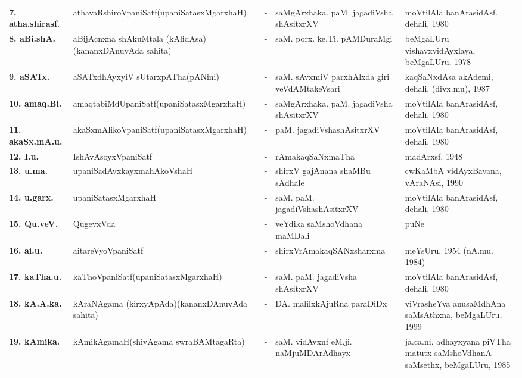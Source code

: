 {\begin{longtable}{@{}lp{5cm}cp{5cm}<{\raggedright}p{3cm}<{\raggedright}@{}}
{\bf 7. atha.shirasf.} & athavaRshiroVpaniSatf\newline (upaniSatasxMgarxhaH) &-& saMgArxhaka. paM. jagadiVsha shAsitxrXV & moVtilAla banArasidAsf. dehali, 1980\\
{\bf 8. aBi.shA.} & aBijAcnxna shAkuMtala (kAlidAsa)\newline (kananxDAnuvAda sahita) &-& saM. porx. ke.Ti. pAMDuraMgi &  beMgaLUru vishavxvidAyxlaya, beMgaLUru, 1978\\
{\bf 9. aSATx.} & aSATxdhAyxyiV sUtarxpATha\newline (pANini) &-& saM. sAvxmiV parxhAlxda giri veVdAMtakeVsari & kaqSaNxdAsa akAdemi, dehali, (divx.mu), 1987\\
{\bf 10. amaq.Bi.} & amaqtabiMdUpaniSatf\newline (upaniSatasxMgarxhaH) &-& saMgArxhaka. paM. jagadiVsha shAsitxrXV & moVtilAla banArasidAsf,  dehali, 1980\\
{\bf 11. akaSx.mA.u.} & akaSxmAlikoVpaniSatf\newline (upaniSatasxMgarxhaH) &-& paM. jagadiVshashAsitxrXV & moVtilAla banArasidAsf, dehali, 1980\\
{\bf 12. I.u.} & IshAvAsoyxVpaniSatf &-& rAmakaqSaNxmaTha & madArxsf, 1948\\
{\bf 13. u.ma.} & upaniSadAvxkayxmahAkoVshaH &-& shirxV gajAnana shaMBu sAdhale & cwKaMbA vidAyxBavana, vAraNAsi, 1990\\
{\bf 14. u.garx.} & upaniSatasxMgarxhaH &-& saM. paM. jagadiVshashAsitxrXV & moVtilAla banArasidAsf, dehali, 1980\\
{\bf 15. Qu.veV.} & QugevxVda &-& veYdika saMshoVdhana maMDali & puNe\\
{\bf 16. ai.u.} & aitareVyoVpaniSatf &-& shirxVrAmakaqSANxsharxma & meYsUru, 1954 (nA.mu. 1984)\\
{\bf 17. kaTha.u.} & kaThoVpaniSatf\newline (upaniSatasxMgarxhaH) &-& saM. paM. jagadiVsha shAsitxrXV & moVtilAla banArasidAsf, dehali, 1980\\
{\bf 18. kA.A.ka.} & kAraNAgama (kirxyApAda)\newline (kananxDAnuvAda sahita) &-& DA. malilxkAjuRna paraDiDx & viVrasheYva anusaMdhAna saMsAthxna, beMgaLUru, 1999\\
{\bf 19. kAmika.} & kAmikAgamaH\newline (shivAgama swraBAMtagaRta) &-& saM. vidAvxnf eM.ji. naMjuMDArAdhayx & ja.ca.ni. adhayxyana piVTha matutx saMshoVdhanA saMsethx, beMgaLUru, 1985\\

\end{longtable}}
